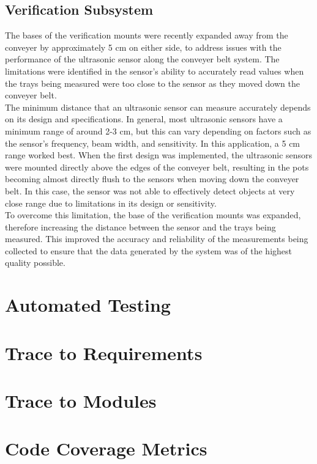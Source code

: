 \documentclass[12pt, titlepage]{article}
\begin{document}
\subsection{Verification Subsystem}

The bases of the verification mounts were recently expanded away from the conveyer by approximately 5 cm on either side, to address issues with the performance of the ultrasonic sensor along the conveyer belt system. The limitations were identified in the sensor's ability to accurately read values when the trays being measured were too close to the sensor as they moved down the conveyer belt.
\\ The minimum distance that an ultrasonic sensor can measure accurately depends on its design and specifications. In general, most ultrasonic sensors have a minimum range of around 2-3 cm, but this can vary depending on factors such as the sensor's frequency, beam width, and sensitivity. In this application, a 5 cm range worked best. When the first design was implemented, the ultrasonic sensors were mounted directly above the edges of the conveyer belt, resulting in the pots becoming almost directly flush to the sensors when moving down the conveyer belt. In this case, the sensor was not able to effectively detect objects at very close range due to limitations in its design or sensitivity.
\\ To overcome this limitation, the base of the verification mounts was expanded, therefore increasing the distance between the sensor and the trays being measured. This improved the accuracy and reliability of the measurements being collected to ensure that the data generated by the system was of the highest quality possible.


\section{Automated Testing}
		
\section{Trace to Requirements}
		
\section{Trace to Modules}		

\section{Code Coverage Metrics}
\end{document}
